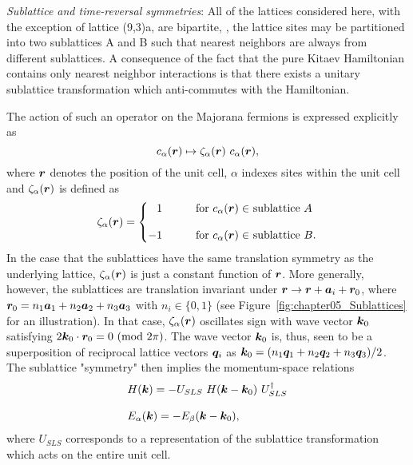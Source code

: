 \textit{Sublattice and time-reversal symmetries}:
All of the lattices considered here, with the exception of lattice (9,3)a, are bipartite, \ie, the lattice sites may be partitioned into two sublattices A and B such that nearest neighbors are always from different sublattices.
A consequence of the fact that the pure Kitaev Hamiltonian contains only nearest neighbor interactions is that there exists a unitary sublattice transformation which anti-commutes with the Hamiltonian.

The action of such an operator on the Majorana fermions is expressed explicitly as
%
\begin{equation}
	c_{\alpha}(\bm{r}) \mapsto {\zeta_{\alpha}(\bm{r})}~c_{\alpha}(\bm{r}),
\end{equation}
%
where $\bm{r}$ denotes the position of the unit cell, $\alpha$ indexes sites within the unit cell and $\zeta_{\alpha}(\bm{r})$ is defined as
%
\begin{equation}
	\zeta_{\alpha}(\br) = \left\{
		\begin{matrix*}[l]
			\phantom{-} 1 &
			\qquad \text{for $c_{\alpha}(\br) \in$ sublattice $A$} \\
			&\\
			-1 &
			\qquad \text{for $c_{\alpha}(\br) \in$ sublattice $B$.}
		\end{matrix*}
	\right.
\end{equation}
%
In the case that the sublattices have the same translation symmetry as the underlying lattice, $\zeta_{\alpha}(\bm{r})$ is just a constant function of $\bm{r}$.
More generally, however, the sublattices are translation invariant under $\bm{r} \rightarrow \bm{r} + \bm{a}_i + \bm{r}_0$, where $\bm{r}_0 = n_1 \bm{a}_1 + n_2 \bm{a}_2 + n_3 \bm{a}_3$ with $n_i \in \{0, 1\}$ (see Figure~\ref{fig:chapter05_Sublattices} for an illustration).
In that case, $\zeta_{\alpha}(\bm{r})$ oscillates sign with wave vector $\bm{k}_0$ satisfying $2 \bm{k}_0 \cdot \bm{r}_0 = 0 ~({\rm mod}~2\pi)$.
The wave vector $\bm{k}_0$ is, thus, seen to be a superposition of reciprocal lattice vectors $\bm{q}_i$ as $\bm{k}_0 = (n_1 \bm{q}_1 + n_2 \bm{q}_2 + n_3 \bm{q}_3)/2$.
The sublattice "symmetry" then implies the momentum-space relations
%
\begin{equation}
	\begin{matrix*}[l]
		H(\bk) = -U_{SLS}~H(\bk - \bk_0)~U\dag_{SLS}\\
		\\
		E_{\alpha}(\bk) = -E_{\beta}(\bk - \bk_0),
	\end{matrix*}
\end{equation}
%
where $U_{SLS}$ corresponds to a representation of the sublattice transformation which acts on the entire unit cell.
